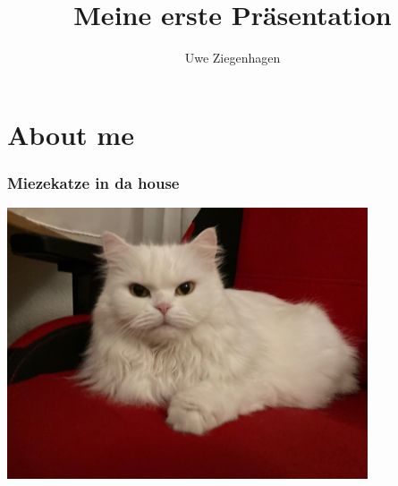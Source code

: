 \documentclass[ngerman]{beamer}
\author{Uwe Ziegenhagen}
\title{Meine erste Präsentation \ch{CO2} \\}
\institute{Köln}
\begin{document}
\begin{frame}
\maketitle
\end{frame}

\begin{frame}
\tableofcontents
\end{frame}


\section{About me}


\begin{frame}
\frametitle{Miezekatze in da house}

\begin{center}
\includegraphics[width=0.8\textwidth]{Bilder/Katze2}
\end{center}

\end{frame}
\end{document}
